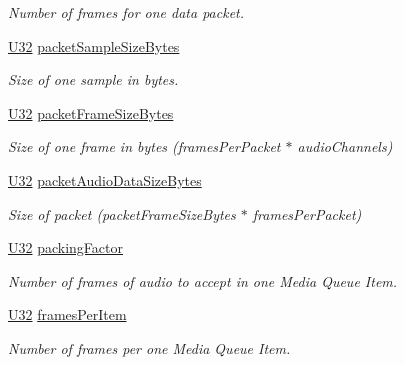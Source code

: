 \begin{DoxyCompactItemize}
\begin{DoxyCompactList}\small\item\em Number of frames for one data packet. \end{DoxyCompactList}\item 
\hyperlink{openavb__types__base__pub_8h_a696390429f2f3b644bde8d0322a24124}{U32} \hyperlink{structmedia__q__pub__map__uncmp__audio__info__t_affb5b0213ff6cfafd726c5c7a4958beb}{packet\+Sample\+Size\+Bytes}
\begin{DoxyCompactList}\small\item\em Size of one sample in bytes. \end{DoxyCompactList}\item 
\hyperlink{openavb__types__base__pub_8h_a696390429f2f3b644bde8d0322a24124}{U32} \hyperlink{structmedia__q__pub__map__uncmp__audio__info__t_ac26de86e26ac41388da8721b8bbdc592}{packet\+Frame\+Size\+Bytes}
\begin{DoxyCompactList}\small\item\em Size of one frame in bytes (frames\+Per\+Packet $\ast$ audio\+Channels) \end{DoxyCompactList}\item 
\hyperlink{openavb__types__base__pub_8h_a696390429f2f3b644bde8d0322a24124}{U32} \hyperlink{structmedia__q__pub__map__uncmp__audio__info__t_a74ea99827baf90850caefe2a10f25721}{packet\+Audio\+Data\+Size\+Bytes}
\begin{DoxyCompactList}\small\item\em Size of packet (packet\+Frame\+Size\+Bytes $\ast$ frames\+Per\+Packet) \end{DoxyCompactList}\item 
\hyperlink{openavb__types__base__pub_8h_a696390429f2f3b644bde8d0322a24124}{U32} \hyperlink{structmedia__q__pub__map__uncmp__audio__info__t_af54e12a5e4f46ccf41a32ff0ea9b3405}{packing\+Factor}
\begin{DoxyCompactList}\small\item\em Number of frames of audio to accept in one Media Queue Item. \end{DoxyCompactList}\item 
\hyperlink{openavb__types__base__pub_8h_a696390429f2f3b644bde8d0322a24124}{U32} \hyperlink{structmedia__q__pub__map__uncmp__audio__info__t_a584c8e40420ea0739971d02cefc8dd93}{frames\+Per\+Item}
\begin{DoxyCompactList}\small\item\em Number of frames per one Media Queue Item. \end{DoxyCompactList}\item 

\end{DoxyCompactItemize}
